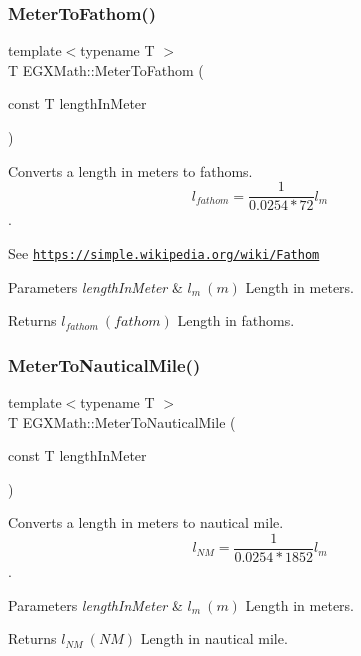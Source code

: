 \subsubsection{\texorpdfstring{Meter\+To\+Fathom()}{MeterToFathom()}}
{\footnotesize\ttfamily template$<$typename T $>$ \\
T E\+G\+X\+Math\+::\+Meter\+To\+Fathom (\begin{DoxyParamCaption}\item[{const T}]{length\+In\+Meter }\end{DoxyParamCaption})}



Converts a length in meters to fathoms. \[ l_{fathom}= \frac{1}{0.0254 * 72} l_{m} \]. 

See \href{https://simple.wikipedia.org/wiki/Fathom}{\tt https\+://simple.\+wikipedia.\+org/wiki/\+Fathom} 
\begin{DoxyParams}{Parameters}
{\em length\+In\+Meter} & $ l_{m}\ (m)$ Length in meters. \\
\hline
\end{DoxyParams}
\begin{DoxyReturn}{Returns}
$ l_{fathom}\ (fathom)$ Length in fathoms. 
\end{DoxyReturn}
\mbox{\label{group___e_g_x_math-_conversions-_length_conversions-_meter-_nautical_ga501f0dd53cb3c21d377eac2a18fabdf8}} 
\subsubsection{\texorpdfstring{Meter\+To\+Nautical\+Mile()}{MeterToNauticalMile()}}
{\footnotesize\ttfamily template$<$typename T $>$ \\
T E\+G\+X\+Math\+::\+Meter\+To\+Nautical\+Mile (\begin{DoxyParamCaption}\item[{const T}]{length\+In\+Meter }\end{DoxyParamCaption})}



Converts a length in meters to nautical mile. \[ l_{NM}= \frac{1}{0.0254 * 1852} l_{m} \]. 


\begin{DoxyParams}{Parameters}
{\em length\+In\+Meter} & $ l_{m}\ (m)$ Length in meters. \\
\hline
\end{DoxyParams}
\begin{DoxyReturn}{Returns}
$ l_{NM}\ (NM)$ Length in nautical mile. 
\end{DoxyReturn}
